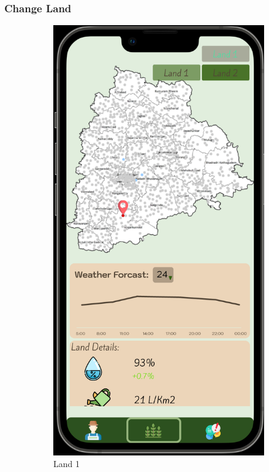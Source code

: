 \subsubsection{Change Land}
\begin{figure}[ht] 
  \begin{subfigure}[b]{0.6\linewidth}
    \centering
    \includegraphics[width=0.8\linewidth]{figures/chooseLand.png}
    \caption{Land 1} 
    \label{fig:a} 
    \vspace{4ex}
  \end{subfigure}%
  \begin{subfigure}[b]{0.6\linewidth}
    \centering

\end{subfigure}
\end{figure}
